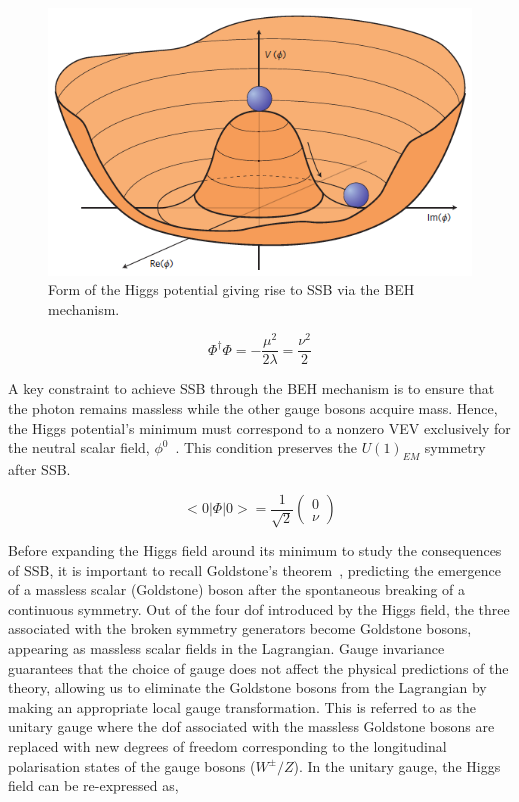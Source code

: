 \begin{figure}[h]
\centering
\includegraphics[width= .7\textwidth]{Figures/Introduction/higgspotential.png}
\caption{Form of the Higgs potential giving rise to SSB via the BEH mechanism.}
\label{Figure:Introduction_HiggsPotential}
\end{figure}

\begin{equation}
    \Phi^{\dagger}\Phi = -\frac{\mu^{2}}{2\lambda} = \frac{\nu^2}{2}
\end{equation}

A key constraint to achieve SSB through the BEH mechanism is to ensure that the photon remains massless while the other gauge bosons acquire mass. Hence, the Higgs potential's minimum must correspond to a nonzero VEV exclusively for the neutral scalar field, $\phi^{0}$~\cite{Higgs_VacuumState_Choice}. This condition preserves the $U(1)_{EM}$ symmetry after SSB.

\begin{equation}
    <0|\Phi|0> = \frac{1}{\sqrt{2}} \begin{pmatrix}
        0 \\
        \nu
    \end{pmatrix}
\end{equation}
 
Before expanding the Higgs field around its minimum to study the consequences of SSB, it is important to recall Goldstone's theorem~\cite{Goldstone}, predicting the emergence of a massless scalar (Goldstone) boson after the spontaneous breaking of a continuous symmetry. Out of the four dof introduced by the Higgs field, the three associated with the broken symmetry generators become Goldstone bosons, appearing as massless scalar fields in the Lagrangian. Gauge invariance guarantees that the choice of gauge does not affect the physical predictions of the theory, allowing us to eliminate the Goldstone bosons from the Lagrangian by making an appropriate local gauge transformation. This is referred to as the unitary gauge where the dof associated with the massless Goldstone bosons are replaced with new degrees of freedom corresponding to the longitudinal polarisation states of the gauge bosons ($W^{\pm}/Z$). In the unitary gauge, the Higgs field can be re-expressed as,

